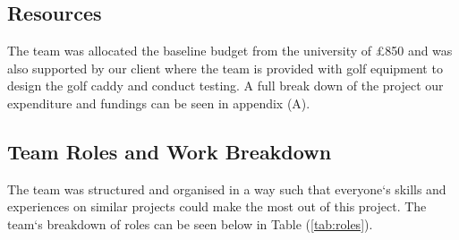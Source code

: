 \documentclass[11pt,landscape]{article}
\begin{document}
\begin{multicols}{3}
\subsection{Resources}
The team was allocated the baseline budget from the university of £850 and was
also supported by our client where the team is provided with golf equipment to
design the golf caddy and conduct testing. A full break down of the project our
expenditure and fundings can be seen in appendix (A). 

\subsection{Team Roles and Work Breakdown}
The team was structured and organised in a way such that everyone`s skills and
experiences on similar projects could make the most out of this project. The
team`s breakdown of roles can be seen below in Table (\ref{tab:roles}). 

\begin{table}[H]
    \begin{center}
        \label{tab:roles}
    \end{center}
\end{table}


\end{multicols}
\end{document}
